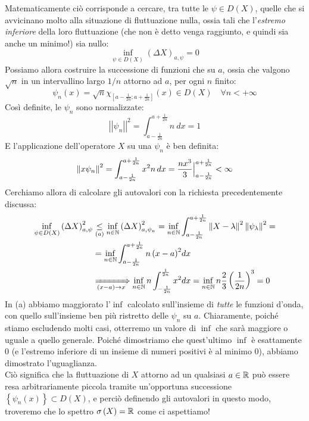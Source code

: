 \documentclass[../../FisicaTeorica.tex]{subfiles}
\begin{document}
Matematicamente ciò corrisponde a cercare, tra tutte le $\psi \in D(X)$, quelle che si avvicinano molto alla situazione di fluttuazione nulla, ossia tali che l'\textit{estremo inferiore} della loro fluttuazione (che non è detto venga raggiunto, e quindi sia anche un minimo!) sia nullo:
\[
\inf_{\psi\in D\left(X\right)}{\left(\Delta X\right)_{a,\psi}}=0
\]
Possiamo allora costruire la successione di funzioni che  su $a$, ossia che valgono $\sqrt{n}$ in un intervallino largo $1/n$ attorno ad $a$, per ogni $n$ finito:
\[
\psi_n\left(x\right)=\sqrt n \chi_{\left[a-\frac{1}{2n};a+\frac{1}{2n}\right]}\left(x\right)\in D\left(X\right) \quad \forall n < +\infty
\]
Così definite, le $\psi_n$ sono normalizzate:
\[
\left|\left|\psi_n\right|\right|^2= \int_{a-\frac{1}{2n}}^{a+\frac{1}{2n}}{n\ dx}=1
\]
E l'applicazione dell'operatore $X$ su una $\psi_n$ è ben definita:
\[
\left\lVert x\psi_n\right\rVert^2 = \int_{a-\frac{1}{2n}}^{a+\frac{1}{2n}} x^2 n\,dx = \frac{nx^3}{3}\Big |^{a+\frac{1}{2n}}_{a-\frac{1}{2n}} < \infty
\]
Cerchiamo allora di calcolare gli autovalori con la richiesta  precedentemente discussa:
\begin{align*}
\inf_{\psi\in D\left(X\right)}{\left(\Delta X\right)_{a,\psi}^2}&\underset{(a)}{\leq} \inf_{n\in \mathbb{N}}{\left(\Delta X\right)_{a,\psi_n}^2}=
\inf_{n\in\mathbb{N}}\int_{a-\frac{1}{2n}}^{a+\frac{1}{2n}} \left\lVert X-\lambda\right\rVert^2 \left\lVert\psi_\lambda\right\rVert^2 = \\
&= \inf_{n\in\mathbb{N}}{\int_{a-\frac{1}{2n}}^{a+\frac{1}{2n}}{{n\left(x-a\right)}^2dx}} \\
&\xRightarrow[(x-a)\to x]{} \inf_{n\in\mathbb{N}}{n\int_{-\frac{1}{2n}}^{\frac{1}{2n}}{x^2dx}=\inf_{n\in\mathbb{N}}{n\frac{2}{3}\left(\frac{1}{2n}\right)^3}}=0
\end{align*}
In (a) abbiamo maggiorato l'$\inf$ calcolato sull'insieme di \textit{tutte} le funzioni d'onda, con quello sull'insieme ben più ristretto delle $\psi_n$  su $a$. Chiaramente, poiché stiamo escludendo molti casi, otterremo un valore di $\inf$ che sarà maggiore o uguale a quello generale. Poiché dimostriamo che quest'ultimo $\inf$ è esattamente $0$ (e l'estremo inferiore di un insieme di numeri positivi è al minimo $0$), abbiamo dimostrato l'uguaglianza.\\
Ciò significa che la fluttuazione di $X$ attorno ad un qualsiasi $a\in \mathbb{R}$ può essere resa arbitrariamente piccola tramite un'opportuna successione $\left\{\psi_n(x)\right\}\subset D\left(X\right)$, e perciò definendo gli autovalori in questo modo, troveremo che lo spettro $\sigma \left(X\right)=\mathbb{R}$ come ci aspettiamo!\\
\end{document}
